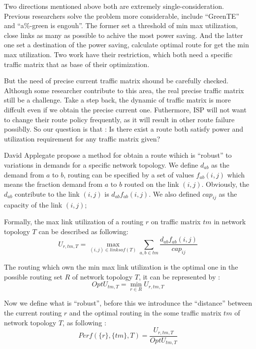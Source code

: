 \documentclass[conference]{IEEEtran}
\begin{document}
Two directions mentioned above both are extremely single-consideration. Previous researchers solve the problem more considerable,
include ``GreenTE'' and ``a\%-green is engouh''. The former set a threshold of min max utilization, close links as many 
as possible to achive the most power saving. And the latter one set a destination of the power saving, calculate optimal route 
for get the min max utilization. Two work have their restriction, which both need a specific traffic matrix that as base of 
their optimization.

But the need of precise current traffic matrix shound be carefully checked. Although some researcher contribute to this area,
the real precise traffic matrix still be a challenge. Take a step back, the dynamic of traffic matrix is more diffcult even
if we obtain the precise current one. Futhermore, ISP will not want to change their route policy frequently, as it will result
in other route failure possiblly. So our question is that : Is there exist a route both satisfy power and utilization 
requirement for any traffic matrix given?

David Applegate propose a method for obtain a route wihich is ``robust'' to variations in demands for a specific network 
topology. We define $d_{ab}$ as the demand from $a$ to $b$, routing can be specified by a set of values $f_{ab}(i,j)$ which 
means the fraction demand from $a$ to $b$ routed on the link $(i,j)$. Obviously, the $d_{ab}$ contribute to the link $(i,j)$ is 
$d_{ab}f_{ab}(i,j)$. We also defined $cap_{ij}$ as the capacity of the link $(i,j)$; 

Formally, the max link utilization of a routing $r$ on traffic matrix $tm$ in network topology $T$ can be described as following:
\begin{equation}
U_{r,tm, T} = \max_{(i,j)\in linksof(T)} \sum_{a,b\in tm} \frac{d_{ab}f_{ab}(i,j)}{cap_{ij}}
\end{equation}

The routing which own the min max link utilization is the optimal one in the possible routing set $R$ of network topology $T$,
it can be represented by :
\begin{equation}
OptU_{tm, T} = \min_{r\in R} U_{r,tm, T}
\end{equation}

Now we define what is ``robust'', before this we introdunce the ``distance'' between the current routing $r$ and the optimal routing
in the some traffic matrix $tm$ of network topology $T$, as following :
\begin{equation}
Perf(\{ r \},\{ tm \}, T) = \frac{U_{r,tm,T}}{OptU_{tm, T}}
\end{equation}
\end{document}

